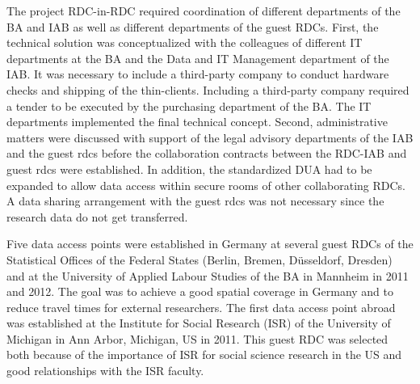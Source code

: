 The project RDC-in-RDC required coordination of different departments of the BA and IAB as well as different departments of the guest RDCs. First, the technical solution was conceptualized with the colleagues of different IT departments at the BA and the Data and IT Management department of the IAB. It was necessary to include a third-party company to conduct hardware checks and shipping of the thin-clients. Including a third-party company required a tender to be executed by the purchasing department of the BA. The IT departments implemented the final technical concept. Second, administrative matters were discussed with support of the legal advisory departments of the IAB and the guest rdcs before the collaboration contracts between the RDC-IAB and guest rdcs were established. In addition, the standardized DUA had to be expanded to allow data access within secure rooms of other collaborating RDCs. A data sharing arrangement with the guest rdcs was not necessary since the research data do not get transferred.

Five data access points were established in Germany at several guest RDCs of the Statistical Offices of the Federal States (Berlin, Bremen, Düsseldorf, Dresden) and at the University of Applied Labour Studies of the BA in Mannheim in 2011 and 2012. The goal was to achieve a good spatial coverage in Germany and to reduce travel times for external researchers. The first data access point abroad was established at the Institute for Social Research (ISR) of the University of Michigan in Ann Arbor, Michigan, US in 2011. This guest RDC was selected both because of the importance of ISR for social science research in the US and good relationships with the ISR faculty.

